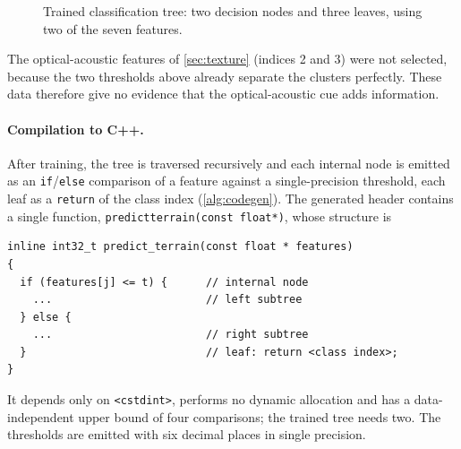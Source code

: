 \documentclass[11pt,a4paper]{article}
\DeclareRobustCommand{\code}[1]{{\let\_\codeus\texttt{#1}}}
\newcommand{\codeus}{\textunderscore\allowbreak{}}
\begin{document}
\begin{figure}[ht]
\centering
{}
\caption{Trained classification tree: two decision nodes and three leaves, using two of the seven features.}
\label{fig:tree}
\end{figure}
\noindent 
The optical-acoustic features of \cref{sec:texture} (indices 2 and 3) were not selected, because the two thresholds above already separate the clusters perfectly. These data therefore give no evidence that the optical-acoustic cue adds information.
 
\paragraph{Compilation to C++.} After training, the tree is traversed recursively and each internal node is emitted as an \code{if}/\code{else} comparison of a feature against a single-precision threshold, each leaf as a \code{return} of the class index (\cref{alg:codegen}). The generated header contains a single function, \code{predict\_terrain(const float*)}, whose structure is
\begin{lstlisting}
inline int32_t predict_terrain(const float * features)
{
  if (features[j] <= t) {      // internal node
    ...                        // left subtree
  } else {
    ...                        // right subtree
  }                            // leaf: return <class index>;
}
\end{lstlisting}
It depends only on \code{<cstdint>}, performs no dynamic allocation and has a data-independent upper bound of four comparisons; the trained tree needs two. The thresholds are emitted with six decimal places in single precision.
 
\end{document}
